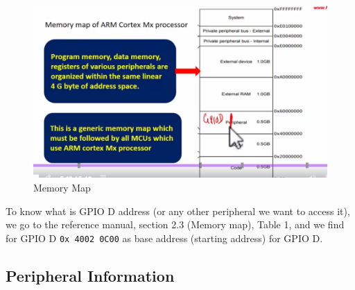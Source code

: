\begin{figure}[h]
\centering
\includegraphics[scale=0.7]{Figures/Embedded_C/memory_map}
\caption{Memory Map}
\label{fig:Embedded_C:memory_map}
\end{figure}

To know what is GPIO D address (or any other peripheral we want to access it), we go to the reference manual, section 2.3 (Memory map), Table 1, and we find for GPIO D \verb|0x 4002 0C00| as base address (starting address) for GPIO D.

\newpage
\subsection{Peripheral Information}
\label{Sub:Peripheral_Information}

